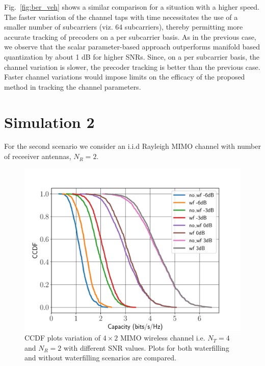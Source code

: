 \documentclass[11pt,a4paper]{report}
\def\imwidth{0.60}
\begin{document}
Fig.~\ref{fig:ber_veh} shows a similar comparison for a situation with
a higher speed. The faster variation of the channel taps with time
necessitates the use of a smaller number of subcarriers (viz. 64
subcarriers), thereby permitting more accurate tracking of precoders
on a per subcarrier basis. As in the previous case, we observe that
the scalar parameter-based approach outperforms manifold based
quantization by about 1 dB for higher SNRs. Since, on a per subcarrier
basis, the channel variation is slower, the precoder tracking is
better than the previous case. Faster channel variations would impose
limits on the efficacy of the proposed method in tracking the channel
parameters.

\section{Simulation 2}
For the second scenario we consider an i.i.d Rayleigh MIMO channel with
number of receeiver antennas, $N_R=2$.

\begin{figure}
\begin{center}
\includegraphics[width=\imwidth\columnwidth]{images/ccdf.pdf}
\caption{CCDF plots variation of $4\times2$ MIMO wireless channel i.e. $N_T=4$
and $N_R=2$ with different SNR values. Plots for both waterfilling and 
without waterfilling scenarios are compared.}
\label{fig:ccdf}
\end{center}
\end{figure}
\end{document}
